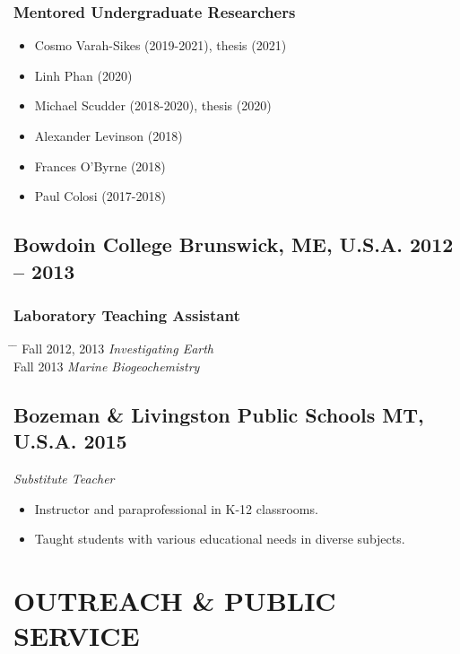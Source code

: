 \documentclass[10pt]{article}
\begin{document}
\subsubsection*{Mentored Undergraduate Researchers}
\begin{itemize}
	\item Cosmo Varah-Sikes (2019-2021), thesis (2021)
	\item Linh Phan (2020)
	\item Michael Scudder (2018-2020), thesis (2020)
	\item Alexander Levinson (2018)
	\item Frances O'Byrne (2018)
	\item Paul Colosi (2017-2018)
\end{itemize}

\subsection*{\textbf{Bowdoin College} \hspace{15pt} Brunswick, ME, U.S.A. \hfill 2012 – 2013}
\subsubsection*{Laboratory Teaching Assistant}
\begin{tabbing} \hspace{10pt} \= \hspace{2.5cm} \=  \kill
\> Fall 2012, 2013 \> \textit{Investigating Earth}\\
\> Fall 2013 \> \textit{Marine Biogeochemistry}
\end{tabbing}

\subsection*{\textbf{Bozeman \& Livingston Public Schools} \hspace{15pt} MT, U.S.A. \hfill 2015}
\textit{Substitute Teacher}
\begin{itemize}
	\item Instructor and paraprofessional in K-12 classrooms.
	\item Taught students with various educational needs in diverse subjects.
\end{itemize}


\section*{OUTREACH \& PUBLIC SERVICE}
\end{document}
